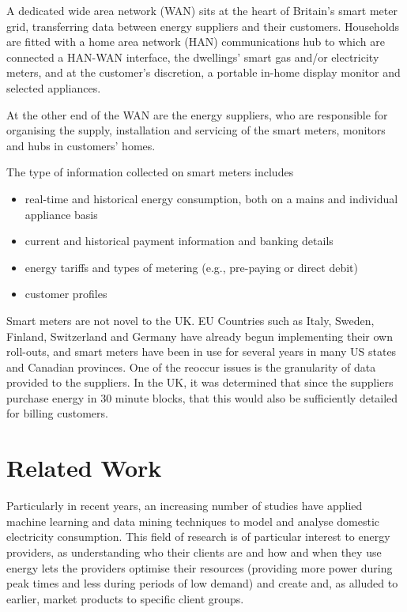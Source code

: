 A dedicated wide area network (WAN) sits at the heart of Britain's smart meter grid, transferring data between energy suppliers and their customers.  Households are fitted with a home area network (HAN) communications hub to which are connected a HAN-WAN interface, the dwellings' smart gas and/or electricity meters, and at the customer's discretion, a portable in-home display monitor and selected appliances.

At the other end of the WAN are the energy suppliers, who are responsible for organising the supply, installation and servicing of the smart meters, monitors and hubs in customers' homes\cite{DECC_4}.  

The type of information collected on smart meters includes\cite{Anderson}
\begin{itemize}
\item real-time and historical energy consumption, both on a mains and individual appliance basis
\item current and historical payment information and banking details
\item energy tariffs and types of metering (e.g., pre-paying or direct debit)
\item customer profiles
\end{itemize}

Smart meters are not novel to the UK.  EU Countries such as Italy, Sweden, Finland, Switzerland and Germany have already begun implementing their own roll-outs, and smart meters have been in use for several years in many US states and Canadian provinces. One of the reoccur issues is the granularity of data provided to the suppliers. In the UK, it was determined that since the suppliers purchase energy in 30 minute blocks, that this would also be sufficiently detailed for billing customers\cite{DECC_2,Decc_3}. 

\section{Related Work}
\label{sec:previousWork}
Particularly in recent years, an increasing number of studies have applied machine learning and data mining techniques to model and analyse domestic electricity consumption. This field of research is of particular interest to energy providers, as understanding who their clients are and how and when they use energy lets the providers optimise their resources (providing more power during peak times and less during periods of low demand) and create and, as alluded to earlier, market products to specific client groups.

